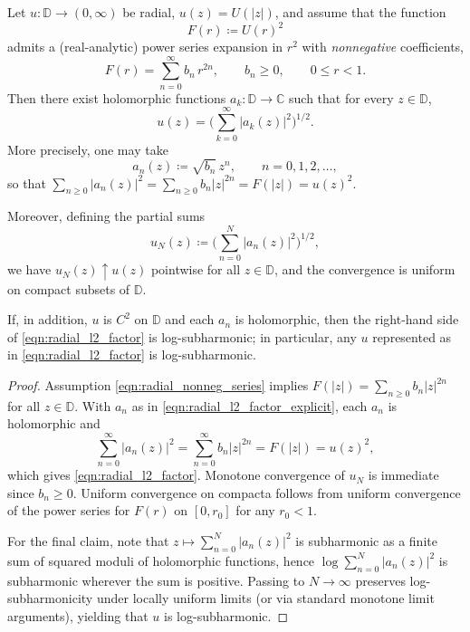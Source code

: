 \documentclass[a4paper,10pt]{amsart}
\begin{document}
\begin{numexamp}\label{thm:radial_hilbert_factorization}
Let $u:\mathbb D\to(0,\infty)$ be radial, $u(z)=U(|z|)$, and assume that the function
\[
F(r)\coloneqq U(r)^2
\]
admits a (real-analytic) power series expansion in $r^2$ with \emph{nonnegative} coefficients,
\begin{equation}\label{eqn:radial_nonneg_series}
F(r)=\sum_{n=0}^\infty b_n\,r^{2n},\qquad b_n\ge 0,\qquad 0\le r<1.
\end{equation}
Then there exist holomorphic functions $a_k:\mathbb D\to\mathbb C$ such that for every $z\in\mathbb D$,
\begin{equation}\label{eqn:radial_l2_factor}
u(z)=\Big(\sum_{k=0}^\infty |a_k(z)|^2\Big)^{1/2}.
\end{equation}
More precisely, one may take
\begin{equation}\label{eqn:radial_l2_factor_explicit}
a_n(z)\coloneqq \sqrt{b_n}\,z^n,\qquad n=0,1,2,\dots,
\end{equation}
so that $\sum_{n\ge 0}|a_n(z)|^2=\sum_{n\ge 0} b_n |z|^{2n}=F(|z|)=u(z)^2$.

Moreover, defining the partial sums
\[
u_N(z)\coloneqq \Big(\sum_{n=0}^N |a_n(z)|^2\Big)^{1/2},
\]
we have $u_N(z)\uparrow u(z)$ pointwise for all $z\in\mathbb D$, and the convergence is uniform on compact subsets of $\mathbb D$.

\smallskip
If, in addition, $u$ is $C^2$ on $\mathbb D$ and each $a_n$ is holomorphic, then the right-hand side of \eqref{eqn:radial_l2_factor} is log-subharmonic; in particular, any $u$ represented as in \eqref{eqn:radial_l2_factor} is log-subharmonic.
\end{numexamp}

\begin{proof}
Assumption \eqref{eqn:radial_nonneg_series} implies $F(|z|)=\sum_{n\ge 0} b_n |z|^{2n}$ for all $z\in\mathbb D$.
With $a_n$ as in \eqref{eqn:radial_l2_factor_explicit}, each $a_n$ is holomorphic and
\[
\sum_{n=0}^\infty |a_n(z)|^2=\sum_{n=0}^\infty b_n |z|^{2n}=F(|z|)=u(z)^2,
\]
which gives \eqref{eqn:radial_l2_factor}. Monotone convergence of $u_N$ is immediate since $b_n\ge 0$.
Uniform convergence on compacta follows from uniform convergence of the power series for $F(r)$ on $[0,r_0]$ for any $r_0<1$.

For the final claim, note that $z\mapsto \sum_{n=0}^N |a_n(z)|^2$ is subharmonic as a finite sum of squared moduli of holomorphic functions, hence $\log \sum_{n=0}^N |a_n(z)|^2$ is subharmonic wherever the sum is positive. Passing to $N\to\infty$ preserves log-subharmonicity under locally uniform limits (or via standard monotone limit arguments), yielding that $u$ is log-subharmonic.
\end{proof}
\end{document}
